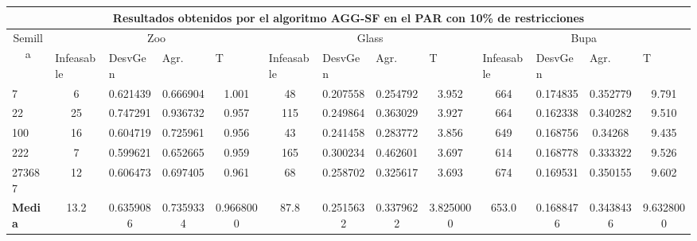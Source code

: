 \begin{table}[H]
	\tiny

	\begin{adjustwidth}{-1cm}{-1cm}%
	
	\begin{tabular}{|l|c|c|c|c|c|c|c|c|c|c|c|c|}
	\hline
	\multicolumn{13}{|c|}{\textbf{Resultados obtenidos por el algoritmo AGG-SF en el PAR con 10\% de restricciones}}                                                                                                                                                                                                                                                                                                                                            \\ \hline
	\multicolumn{1}{|c|}{\multirow{2}{*}{Semilla}} & \multicolumn{4}{c|}{Zoo}                                                                                          & \multicolumn{4}{c|}{Glass}                                                                                         & \multicolumn{4}{c|}{Bupa}                                                                                          \\ \cline{2-13} 
	\multicolumn{1}{|c|}{}                                  & \multicolumn{1}{l|}{Infeasable} & \multicolumn{1}{l|}{DesvGen} & \multicolumn{1}{l|}{Agr.} & \multicolumn{1}{l|}{T} & \multicolumn{1}{l|}{Infeasable} & \multicolumn{1}{l|}{DesvGen} & \multicolumn{1}{l|}{Agr.} & \multicolumn{1}{l|}{T} & \multicolumn{1}{l|}{Infeasable} & \multicolumn{1}{l|}{DesvGen} & \multicolumn{1}{l|}{Agr.} & \multicolumn{1}{l|}{T} \\ \hline
	7   	& 6 & 0.621439 & 0.666904 & 1.001 & 				48 & 0.207558 & 0.254792 & 3.952 &			 	664 & 0.174835 & 0.352779 & 9.791 		\\ \hline
	22 		& 25 & 0.747291 & 0.936732 & 0.957 &				115 & 0.249864 & 0.363029 &	3.927 &		 	664 & 0.162338 & 0.340282 &	9.510		\\ \hline
	100 	& 16 & 0.604719 & 0.725961 & 0.956 &				43 & 0.241458 & 0.283772 & 3.856 &				649 & 0.168756 & 0.34268 & 9.435			\\ \hline
	222 	& 7 & 0.599621 & 0.652665 &	0.959 &				165 & 0.300234 & 0.462601 & 3.697 &			614 & 0.168778 & 0.333322 &	9.526		\\ \hline
	273687 	& 12 & 0.606473 & 0.697405 & 0.961 &				68 & 0.258702 & 0.325617 & 3.693 &				674 & 0.169531 & 0.350155 &	9.602		\\ \hline
	\textbf{Media} & 13.2 & 	0.6359086 & 	0.7359334 & 	0.9668000 & 	87.8 & 	0.2515632 & 	0.3379622 & 	3.8250000 & 	653.0 & 	0.1688476 & 	0.3438436 & 	9.6328000   \\ \hline
	\end{tabular}
	
	\end{adjustwidth}
	
\end{table}


